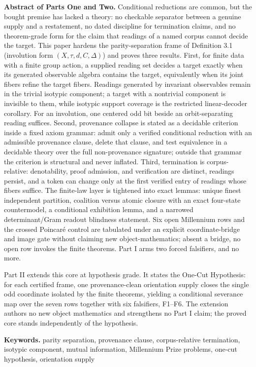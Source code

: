 \documentclass[10pt,twocolumn]{article}
\begin{document}
\textbf{Abstract of Parts One and Two.} Conditional reductions are
common, but the bought premise has lacked a theory: no checkable
separator between a genuine supply and a restatement, no dated
discipline for termination claims, and no theorem-grade form for the
claim that readings of a named corpus cannot decide the target. This
paper hardens the parity-separation frame of Definition 3.1 (involution
form \((X, \tau, d, C, \Delta)\)) and proves three results. First, for
finite data with a finite group action, a supplied reading set decides a
target exactly when its generated observable algebra contains the
target, equivalently when its joint fibers refine the target fibers.
Readings generated by invariant observables remain in the trivial
isotypic component; a target with a nontrivial component is invisible to
them, while isotypic support coverage is the restricted linear-decoder
corollary. For an involution, one centered odd bit beside an
orbit-separating reading suffices. Second, provenance collapse is stated
as a decidable criterion inside a fixed axiom grammar: admit only a
verified conditional reduction with an admissible provenance clause,
delete that clause, and test equivalence in a decidable theory over the
full non-provenance signature; outside that grammar the criterion is
structural and never inflated. Third, termination is corpus-relative:
denotability, proof admission, and verification are distinct, readings
persist, and a token can change only at the first verified entry of
readings whose fibers suffice. The finite-law layer is tightened into
exact lemmas: unique finest independent partition, coalition versus
atomic closure with an exact four-state countermodel, a conditional
exhibition lemma, and a narrowed determinant/Gram readout blindness
statement. Six open Millennium rows and the crossed Poincaré control are
tabulated under an explicit coordinate-bridge and image gate without
claiming new object-mathematics; absent a bridge, no open row invokes
the finite theorems. Part I arms two forced falsifiers, and no more.

Part II extends this core at hypothesis grade. It states the One-Cut
Hypothesis: for each certified frame, one provenance-clean orientation
supply closes the single odd coordinate isolated by the finite theorems,
yielding a conditional severance map over the seven rows together with
six falsifiers, F1--F6. The extension authors no new object mathematics
and strengthens no Part I claim; the proved core stands independently of
the hypothesis.

\textbf{Keywords.} parity separation, provenance clause, corpus-relative
termination, isotypic component, mutual information, Millennium Prize
problems, one-cut hypothesis, orientation supply
\end{document}
